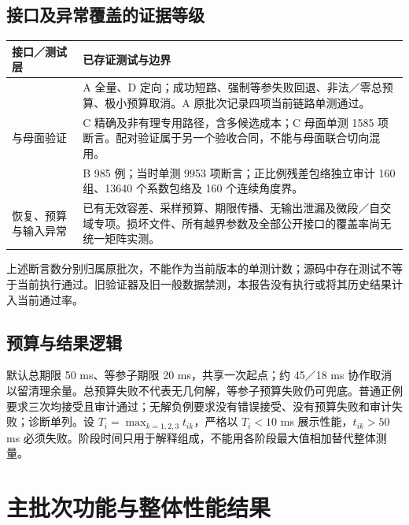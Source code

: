 \documentclass[UTF8,zihao=5,fontset=windows,a4paper]{ctexart}
\begin{document}
\subsection{接口及异常覆盖的证据等级}
\begin{center}\small\renewcommand{\arraystretch}{1.15}
\begin{tabularx}{\linewidth}{@{}p{34mm}Y@{}}\toprule
接口／测试层 & 已存证测试与边界\\\midrule
{} & A 全量、D 定向；成功短路、强制等参失败回退、非法／零总预算、极小预算取消。A 原批次记录四项当前链路单测通过。\\
 与母面验证 & C 精确及非有理专用路径，含多候选成本；C 母面单测 1585 项断言。配对验证属于另一个验收合同，不能与母面联合切向混用。\\
 & B 985 例；当时单测 9953 项断言；正比例残差包络独立审计 160 组、13640 个系数包络及 160 个连续角度界。\\
恢复、预算与输入异常 & 已有无效容差、采样预算、期限传播、无输出泄漏及微段／自交域专项。损坏文件、所有越界参数及全部公开接口的覆盖率尚无统一矩阵实测。\\\bottomrule
\end{tabularx}
\end{center}
上述断言数分别归属原批次，不能作为当前版本的单测计数；源码中存在测试不等于当前执行通过。旧验证器及旧一般数据禁测，本报告没有执行或将其历史结果计入当前通过率。

\subsection{预算与结果逻辑}
默认总期限 50 ms、等参子期限 20 ms，共享一次起点；约 45／18 ms 协作取消以留清理余量。总预算失败不代表无几何解，等参子预算失败仍可兜底。普通正例要求三次均接受且审计通过；无解负例要求没有错误接受、没有预算失败和审计失败；诊断单列。设 $T_i=\max_{k=1,2,3}t_{ik}$，严格以 $T_i<10$ ms 展示性能，$t_{ik}>50$ ms 必须失败。阶段时间只用于解释组成，不能用各阶段最大值相加替代整体测量。

\newpage
\section{主批次功能与整体性能结果}
\end{document}
